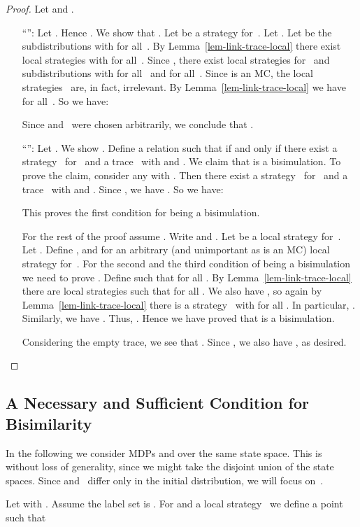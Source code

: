 \begin{proof}
Let  and .
\begin{itemize}[align=left]
\item[``'':]
Let .
Hence .
We show that .
Let  be a strategy for~.
Let .
Let  be the subdistributions with
  for all~.
By Lemma~\ref{lem-link-trace-local} there exist local strategies  with
 for all~.
Since ,
there exist local strategies  for~ and subdistributions  with
 for all~ and
 for all~.
Since  is an MC, the local strategies~ are, in fact, irrelevant.
By Lemma~\ref{lem-link-trace-local} we have  for all~.
So we have:

Since  and~ were chosen arbitrarily, we conclude that .
\item[``'':]
Let .
We show .
Define a relation 
such that  if and only if there exist a strategy~ for~ and a trace~ with
 and .
We claim that  is a bisimulation.
To prove the claim, consider any  with .
Then there exist a strategy~ for~ and a trace~ with
 and .
Since , we have .
So we have:

This proves the first condition for  being a bisimulation.

For the rest of the proof assume .
Write  and .
Let  be a local strategy for~.
Let .
Define ,
   and  for an arbitrary (and unimportant as  is an MC) local strategy  for~.
For the second and the third condition of  being a bisimulation we need to prove
.
Define  such that
 for all .
By Lemma~\ref{lem-link-trace-local} there are local strategies 
such that  for all .
We also have ,
so again by Lemma~\ref{lem-link-trace-local} there is a strategy~ with
 for all . In particular, .
Similarly, we have .
Thus, .
Hence we have proved that  is a bisimulation.

Considering the empty trace, we see that .
Since , we also have , as desired. \qedhere
\end{itemize}
\end{proof}


\subsection{A Necessary and Sufficient Condition for Bisimilarity}\label{subsec:condition_bisimilar}

In the following we consider MDPs  and  over the same state space.
This is without loss of generality, since we might take the disjoint union of the state spaces.
Since  and~ differ only in the initial distribution, we will focus on~.


Let  with .
Assume the label set is .
For  and a local strategy~ we define a point  such that

